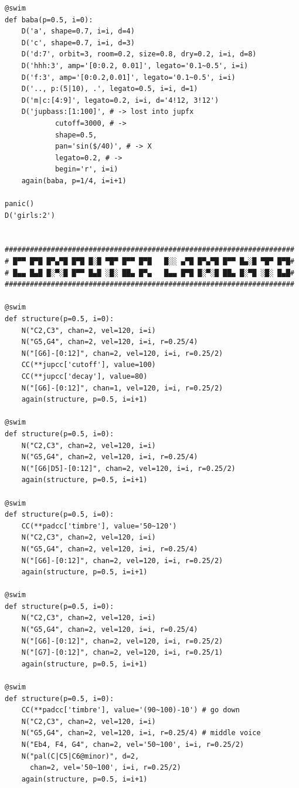 \documentclass[11pt]{article}
\begin{document}
\begin{enumerate}
\begin{verbatim}
@swim
def baba(p=0.5, i=0):
    D('a', shape=0.7, i=i, d=4)
    D('c', shape=0.7, i=i, d=3)
    D('d:7', orbit=3, room=0.2, size=0.8, dry=0.2, i=i, d=8)
    D('hhh:3', amp='[0:0.2, 0.01]', legato='0.1~0.5', i=i)
    D('f:3', amp='[0:0.2,0.01]', legato='0.1~0.5', i=i)
    D('.., p:(5|10), .', legato=0.5, i=i, d=1)
    D('m|c:[4:9]', legato=0.2, i=i, d='4!12, 3!12')
    D('jupbass:[1:100]', # -> lost into jupfx
            cutoff=3000, # ->
            shape=0.5,
            pan='sin($/40)', # -> X
            legato=0.2, # ->
            begin='r', i=i)
    again(baba, p=1/4, i=i+1)

panic()
D('girls:2')


#####################################################################
# █▀▀ █▀█ █▀▄▀█ █▀█ █░█ ▀█▀ █▀▀ █▀█   █░░ ▄▀█ █▀▄▀█ █▀▀ █▄░█ ▀█▀ █▀█#
# █▄▄ █▄█ █░▀░█ █▀▀ █▄█ ░█░ ██▄ █▀▄   █▄▄ █▀█ █░▀░█ ██▄ █░▀█ ░█░ █▄█#
#####################################################################

@swim
def structure(p=0.5, i=0):
    N("C2,C3", chan=2, vel=120, i=i)
    N("G5,G4", chan=2, vel=120, i=i, r=0.25/4)
    N("[G6]-[0:12]", chan=2, vel=120, i=i, r=0.25/2)
    CC(**jupcc['cutoff'], value=100)
    CC(**jupcc['decay'], value=80)
    N("[G6]-[0:12]", chan=1, vel=120, i=i, r=0.25/2)
    again(structure, p=0.5, i=i+1)

@swim
def structure(p=0.5, i=0):
    N("C2,C3", chan=2, vel=120, i=i)
    N("G5,G4", chan=2, vel=120, i=i, r=0.25/4)
    N("[G6|D5]-[0:12]", chan=2, vel=120, i=i, r=0.25/2)
    again(structure, p=0.5, i=i+1)

@swim
def structure(p=0.5, i=0):
    CC(**padcc['timbre'], value='50~120')
    N("C2,C3", chan=2, vel=120, i=i)
    N("G5,G4", chan=2, vel=120, i=i, r=0.25/4)
    N("[G6]-[0:12]", chan=2, vel=120, i=i, r=0.25/2)
    again(structure, p=0.5, i=i+1)

@swim
def structure(p=0.5, i=0):
    N("C2,C3", chan=2, vel=120, i=i)
    N("G5,G4", chan=2, vel=120, i=i, r=0.25/4)
    N("[G6]-[0:12]", chan=2, vel=120, i=i, r=0.25/2)
    N("[G7]-[0:12]", chan=2, vel=120, i=i, r=0.25/1)
    again(structure, p=0.5, i=i+1)

@swim
def structure(p=0.5, i=0):
    CC(**padcc['timbre'], value='(90~100)-10') # go down
    N("C2,C3", chan=2, vel=120, i=i)
    N("G5,G4", chan=2, vel=120, i=i, r=0.25/4) # middle voice
    N("Eb4, F4, G4", chan=2, vel='50~100', i=i, r=0.25/2)
    N("pal(C|C5|C6@minor)", d=2,
      chan=2, vel='50~100', i=i, r=0.25/2)
    again(structure, p=0.5, i=i+1)


\end{verbatim}
\end{enumerate}
\end{document}

